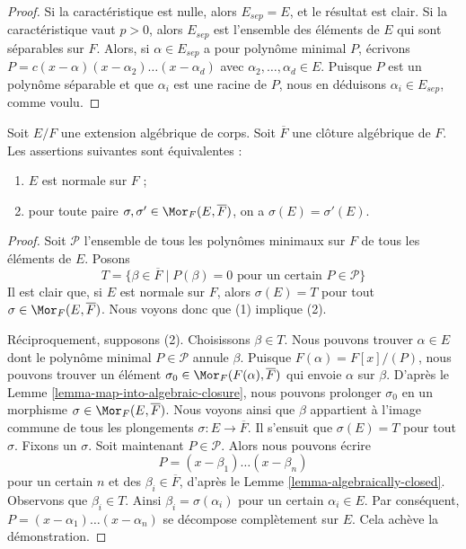 \begin{proof}
Si la caractéristique est nulle, alors $E_{sep} = E$, et le résultat
est clair. Si la caractéristique vaut $p > 0$, alors $E_{sep}$
est l'ensemble des éléments de $E$ qui sont séparables sur $F$.
Alors, si $\alpha \in E_{sep}$ a pour polynôme minimal $P$,
écrivons $P = c(x - \alpha)(x - \alpha_2) \ldots (x - \alpha_d)$
avec $\alpha_2, \ldots, \alpha_d \in E$. Puisque
$P$ est un polynôme séparable et que $\alpha_i$
est une racine de $P$, nous en déduisons $\alpha_i \in E_{sep}$, comme voulu.
\end{proof}

\begin{lemma}
\label{lemma-characterize-normal}
Soit $E/F$ une extension algébrique de corps. Soit $\overline{F}$ une
clôture algébrique de $F$. Les assertions suivantes sont équivalentes :
\begin{enumerate}
\item $E$ est normale sur $F$ ;
\item pour toute paire $\sigma, \sigma' \in \Mor_F(E, \overline{F})$, on
a $\sigma(E) = \sigma'(E)$.
\end{enumerate}
\end{lemma}

\begin{proof}
Soit $\mathcal{P}$ l'ensemble de tous les polynômes minimaux sur $F$
de tous les éléments de $E$. Posons
$$
T =
\{\beta \in \overline{F} \mid P(\beta) = 0\text{ pour un certain }P \in \mathcal{P}\}
$$
Il est clair que, si $E$ est normale sur $F$, alors $\sigma(E) = T$
pour tout $\sigma \in \Mor_F(E, \overline{F})$. Nous voyons donc que (1)
implique (2).

\medskip\noindent
Réciproquement, supposons (2). Choisissons $\beta \in T$.
Nous pouvons trouver $\alpha \in E$ dont le polynôme minimal
$P \in \mathcal{P}$ annule $\beta$. Puisque $F(\alpha) = F[x]/(P)$,
nous pouvons trouver un élément $\sigma_0 \in \Mor_F(F(\alpha), \overline{F})$ qui envoie
$\alpha$ sur $\beta$. D'après le Lemme \ref{lemma-map-into-algebraic-closure},
nous pouvons prolonger $\sigma_0$ en un morphisme $\sigma \in \Mor_F(E, \overline{F})$.
Nous voyons ainsi que $\beta$ appartient à l'image commune de tous les plongements
$\sigma : E \to \overline{F}$. Il s'ensuit que $\sigma(E) = T$
pour tout $\sigma$. Fixons un $\sigma$. Soit maintenant $P \in \mathcal{P}$. Alors nous
pouvons écrire
$$
P = (x - \beta_1) \ldots (x - \beta_n)
$$
pour un certain $n$ et des $\beta_i \in \overline{F}$, d'après le
Lemme \ref{lemma-algebraically-closed}. Observons que $\beta_i \in T$.
Ainsi $\beta_i = \sigma(\alpha_i)$ pour un certain $\alpha_i \in E$. Par conséquent,
$P = (x - \alpha_1) \ldots (x - \alpha_n)$ se décompose complètement sur $E$.
Cela achève la démonstration.
\end{proof}

